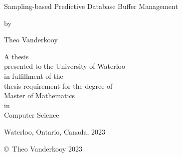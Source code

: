 \pagestyle{empty}

\begin{titlepage}
        \begin{center}
        \vspace*{1.0cm}

        \Huge
        {Sampling-based Predictive Database Buffer Management}

        \vspace*{1.0cm}

        \normalsize
        by \\

        \vspace*{1.0cm}

        \Large
        Theo Vanderkooy \\

        \vspace*{3.0cm}

        \normalsize
        A thesis \\
        presented to the University of Waterloo \\ 
        in fulfillment of the \\
        thesis requirement for the degree of \\
        Master of Mathematics \\
        in \\
        Computer Science \\

        \vspace*{2.0cm}

        Waterloo, Ontario, Canada, 2023 \\

        \vspace*{1.0cm}

        \copyright\ Theo Vanderkooy 2023 \\
        \end{center}
\end{titlepage}

\pagestyle{plain}
\setcounter{page}{2}

